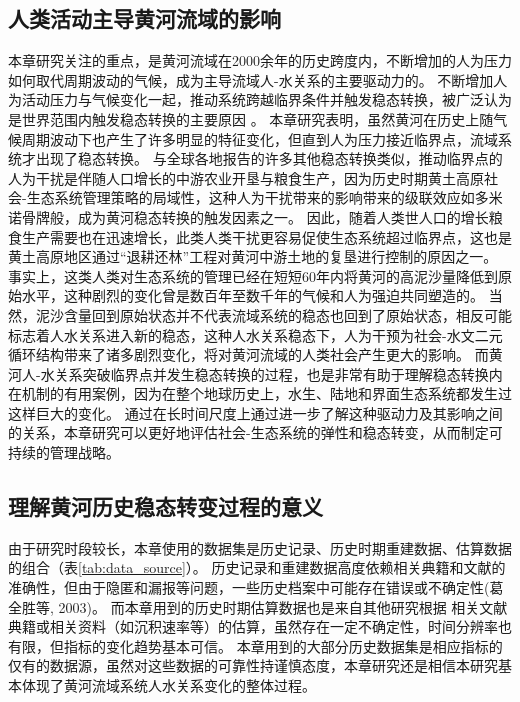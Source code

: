 
\subsection{人类活动主导黄河流域的影响}\label{ch3:sec:human-activity}

本章研究关注的重点，是黄河流域在2000余年的历史跨度内，不断增加的人为压力如何取代周期波动的气候，成为主导流域人-水关系的主要驱动力的。
不断增加人为活动压力与气候变化一起，推动系统跨越临界条件并触发稳态转换，被广泛认为是世界范围内触发稳态转换的主要原因 \cite{scheffer2001,scheffer2003}。
本章研究表明，虽然黄河在历史上随气候周期波动下也产生了许多明显的特征变化，但直到人为压力接近临界点，流域系统才出现了稳态转换。
与全球各地报告的许多其他稳态转换类似，推动临界点的人为干扰是伴随人口增长的中游农业开垦与粮食生产，因为历史时期黄土高原社会-生态系统管理策略的局域性，这种人为干扰带来的影响带来的级联效应如多米诺骨牌般，成为黄河稳态转换的触发因素之一\cite{rocha2018}。
因此，随着人类世人口的增长粮食生产需要也在迅速增长，此类人类干扰更容易促使生态系统超过临界点，这也是黄土高原地区通过“退耕还林”工程对黄河中游土地的复垦进行控制的原因之一。
事实上，这类人类对生态系统的管理已经在短短60年内将黄河的高泥沙量降低到原始水平，这种剧烈的变化曾是数百年至数千年的气候和人为强迫共同塑造的\cite{wang2016e, ji2018}。
当然，泥沙含量回到原始状态并不代表流域系统的稳态也回到了原始状态，相反可能标志着人水关系进入新的稳态，这种人水关系稳态下，人为干预为社会-水文二元循环结构带来了诸多剧烈变化，将对黄河流域的人类社会产生更大的影响。
而黄河人-水关系突破临界点并发生稳态转换的过程，也是非常有助于理解稳态转换内在机制的有用案例，因为在整个地球历史上，水生、陆地和界面生态系统都发生过这样巨大的变化\cite{hughes2013, rocha2018}。
通过在长时间尺度上通过进一步了解这种驱动力及其影响之间的关系，本章研究可以更好地评估社会-生态系统的弹性和稳态转变，从而制定可持续的管理战略\cite{scheffer2003}。

\subsection{理解黄河历史稳态转变过程的意义}

由于研究时段较长，本章使用的数据集是历史记录、历史时期重建数据、估算数据的组合（表\ref{tab:data_source}）。
历史记录和重建数据高度依赖相关典籍和文献的准确性，但由于隐匿和漏报等问题，一些历史档案中可能存在错误或不确定性(葛全胜等, 2003)。
而本章用到的历史时期估算数据也是来自其他研究根据 相关文献典籍或相关资料（如沉积速率等）的估算，虽然存在一定不确定性，时间分辨率也有限，但指标的变化趋势基本可信。
本章用到的大部分历史数据集是相应指标的仅有的数据源，虽然对这些数据的可靠性持谨慎态度，本章研究还是相信本研究基本体现了黄河流域系统人水关系变化的整体过程。
